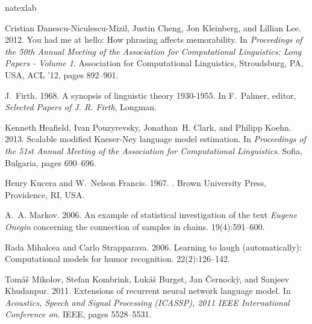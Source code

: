 \documentclass[11pt,a4paper]{article}
\begin{document}
\begin{thebibliography}{}
\expandafter\ifx\csname natexlab\endcsname\relax\def\natexlab#1{#1}\fi

Cristian Danescu-Niculescu-Mizil, Justin Cheng, Jon Kleinberg, and Lillian Lee.
  2012.
\newblock You had me at hello: How phrasing affects memorability.
\newblock In {\em Proceedings of the 50th Annual Meeting of the Association for
  Computational Linguistics: Long Papers - Volume 1\/}. Association for
  Computational Linguistics, Stroudsburg, PA, USA, ACL '12, pages 892--901.

J.~Firth. 1968.
\newblock A synopsis of linguistic theory 1930-1955.
\newblock In F.~Palmer, editor, {\em Selected Papers of J. R. Firth\/},
  Longman.

Kenneth Heafield, Ivan Pouzyrevsky, Jonathan~H. Clark, and Philipp Koehn. 2013.
\newblock Scalable modified {Kneser-Ney} language model estimation.
\newblock In {\em Proceedings of the 51st Annual Meeting of the Association for
  Computational Linguistics\/}. Sofia, Bulgaria, pages 690--696.

Henry Kucera and W.~Nelson Francis. 1967.
.
\newblock Brown University Press, Providence, RI, USA.

A.~A. Markov. 2006.
\newblock An example of statistical investigation of the text {\it Eugene
  Onegin} concerning the connection of samples in chains.
 19(4):591--600.

Rada Mihalcea and Carlo Strapparava. 2006.
\newblock Learning to laugh (automatically): Computational models for humor
  recognition.
 22(2):126--142.

Tom{\'a}{\v{s}} Mikolov, Stefan Kombrink, Luk{\'a}{\v{s}} Burget, Jan
  {\v{C}}ernock{\`y}, and Sanjeev Khudanpur. 2011.
\newblock Extensions of recurrent neural network language model.
\newblock In {\em Acoustics, Speech and Signal Processing (ICASSP), 2011 IEEE
  International Conference on\/}. IEEE, pages 5528--5531.


\end{thebibliography}
\end{document}

